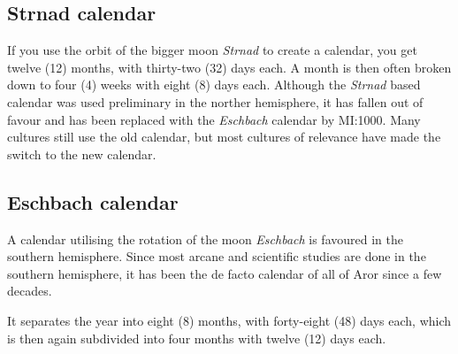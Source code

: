 \subsection*{Strnad calendar}

If you use the orbit of the bigger moon \emph{Strnad} to create a
calendar, you get twelve (12) months, with thirty-two (32) days
each. A month is then often broken down to four (4) weeks with eight
(8) days each. Although the \emph{Strnad} based calendar was used
preliminary in the norther hemisphere, it has fallen out of favour and
has been replaced with the \emph{Eschbach} calendar by MI:1000. Many
cultures still use the old calendar, but most cultures of relevance
have made the switch to the new calendar.

\subsection*{Eschbach calendar}

A calendar utilising the rotation of the moon \emph{Eschbach} is favoured
in the southern hemisphere. Since most arcane and scientific studies are
done in the southern hemisphere, it has been the de facto calendar of all
of Aror since a few decades.

It separates the year into eight (8) months, with forty-eight (48) days
each, which is then again subdivided into four months with twelve (12)
days each.
